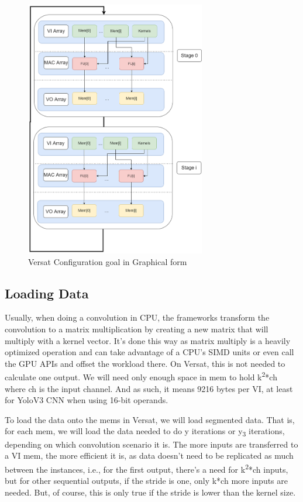 \begin{figure}[!htbp]
    \centering
    \includegraphics[width=0.7\textwidth]{Figures/Convolution.drawio.png}
    \caption{Versat Configuration goal in Graphical form}
    \label{VersatConfiguration}
\end{figure}

\subsection{Loading Data}

Usually, when doing a convolution in CPU, the frameworks transform the convolution to a matrix multiplication by creating a new matrix that will multiply with a
kernel vector. It's done this way as matrix multiply is a heavily optimized operation and can take advantage of a CPU's SIMD units or even call the GPU APIs
and offset the workload there. On Versat, this is not needed to calculate one output. We will need only enough space in mem to hold
k\textsuperscript{2}*ch where ch is the input channel. And as such, it means 9216 bytes per VI, at least for YoloV3 CNN when using 16-bit operands.

To load the data onto the mems in Versat, we will load segmented data. That is, for each mem, we will load the data
needed to do y iterations or y\textsubscript{3} iterations, depending on which convolution scenario it is.
The more inputs are transferred to a VI mem, the more efficient it is, as data doesn't need to be replicated as much between the instances,
i.e., for the first output, there's a need for k\textsuperscript{2}*ch inputs, but for other sequential outputs, if the stride is one, only k*ch more inputs are needed. But, of course, this is only true if the stride is lower than the kernel size.

